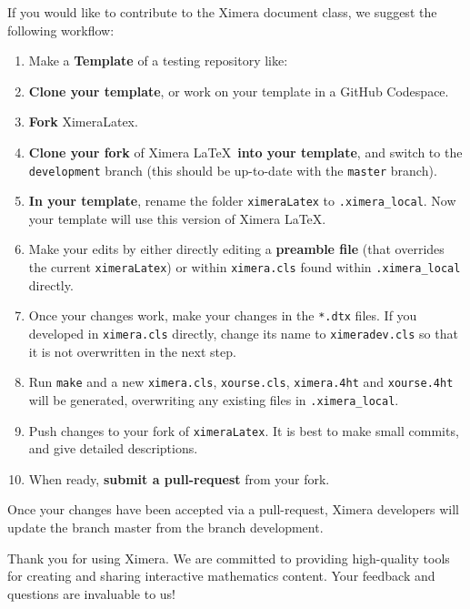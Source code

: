 \documentclass{ximera}
\begin{document}
If you would like to contribute to the Ximera document class, we suggest the following workflow:
\begin{enumerate}
\item Make a \textbf{Template} of a testing repository like: 
\item \textbf{Clone your template}, or work on your template in a GitHub Codespace.
\item \textbf{Fork} XimeraLatex.
\item \textbf{Clone your fork} of Ximera \LaTeX\ \textbf{into your template}, and switch to the \verb!development! branch (this should be up-to-date with the \verb!master! branch).
\item \textbf{In your template}, rename the folder \verb!ximeraLatex! to \verb!.ximera_local!. Now your template will use this version of Ximera \LaTeX.
\item Make your edits by either directly editing a \textbf{preamble file} (that overrides the current \verb!ximeraLatex!) or within \verb!ximera.cls! found within \verb!.ximera_local! directly.
\item Once your changes work, make your changes in the \verb!*.dtx! files. If you developed in \verb!ximera.cls! directly, change its name to \verb!ximeradev.cls! so that it is not overwritten in the next step.
\item Run \verb!make! and a new \verb!ximera.cls!, \verb!xourse.cls!, \verb!ximera.4ht! and \verb!xourse.4ht! will be generated, overwriting any existing files in \verb!.ximera_local!.
\item Push changes to your fork of \verb!ximeraLatex!. It is best to make small commits, and give detailed descriptions.
\item When ready, \textbf{submit a pull-request} from your fork.
\end{enumerate}
Once your changes have been accepted via a pull-request, Ximera developers will update the branch master from the branch development.


Thank you for using Ximera. We are committed to providing high-quality tools
for creating and sharing interactive mathematics content. Your feedback and
questions are invaluable to us!
\end{document}
